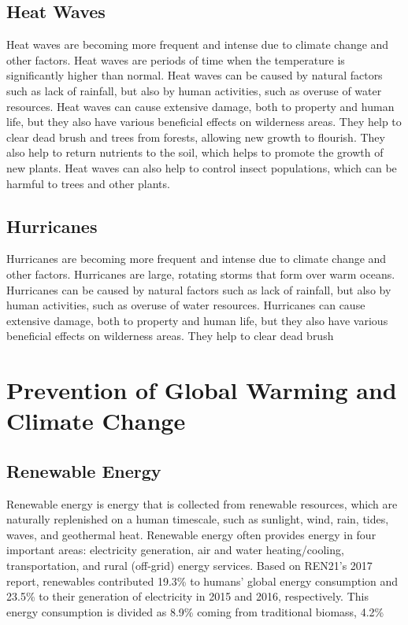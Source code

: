 \documentclass{article}
\begin{document}
\subsection{Heat Waves}
Heat waves are becoming more frequent and intense due to climate change and
other factors. Heat waves are periods of time when the temperature is
significantly higher than normal. Heat waves can be caused by natural factors
such as lack of rainfall, but also by human activities, such as overuse of
water resources. Heat waves can cause extensive damage, both to property and
human life, but they also have various beneficial effects on wilderness areas.
They help to clear dead brush and trees from forests, allowing new growth to
flourish. They also help to return nutrients to the soil, which helps to
promote the growth of new plants. Heat waves can also help to control insect
populations, which can be harmful to trees and other plants.

\subsection{Hurricanes}
Hurricanes are becoming more frequent and intense due to climate change and
other factors. Hurricanes are large, rotating storms that form over warm
oceans. Hurricanes can be caused by natural factors such as lack of rainfall,
but also by human activities, such as overuse of water resources. Hurricanes
can cause extensive damage, both to property and human life, but they also have
various beneficial effects on wilderness areas. They help to clear dead brush

\section{Prevention of Global Warming and Climate Change}
\subsection{Renewable Energy}
Renewable energy is energy that is collected from renewable resources, which
are naturally replenished on a human timescale, such as sunlight, wind, rain,
tides, waves, and geothermal heat. Renewable energy often provides energy in
four important areas: electricity generation, air and water heating/cooling,
transportation, and rural (off-grid) energy services. Based on REN21's 2017
report, renewables contributed 19.3\% to humans' global energy consumption and
23.5\% to their generation of electricity in 2015 and 2016, respectively. This
energy consumption is divided as 8.9\% coming from traditional biomass, 4.2\%
\end{document}
